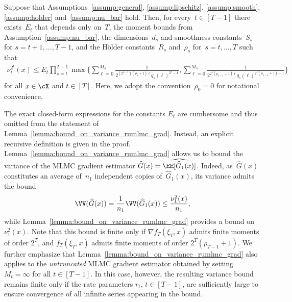 \documentclass[11pt]{article}
\let\hat\widehat
\begin{document}
\begin{lemma}
\label{lemma:bound_on_variance_rumlmc_grad} 
Suppose that Assumptions~\ref{assump:general}, \ref{assump:lipschitz}, \ref{assump:smooth}, \ref{assump:holder} and~\ref{assump:nu_bar} hold. Then, for every~$t\in[T-1]$ there exists~$E_t$ that depends only on~$T$, the moment bounds from Assumption~\ref{assump:nu_bar}, the dimensions~$d_s$ and smoothness constants~$S_s$ for $s = t+1,\ldots,T-1$, and the Hölder constants~$R_s$ and~$\rho_s$ for~$s = t,\ldots,T$ such that
    \begin{align*}
        \nu_t^{2^t}(x) \leq  E_t\prod_{s=t}^{T-1}\max\bigg\{ \sum_{\ell=0}^{M_s}\frac{1}{2^{(2^{s-1})(\rho_s+1)\ell} q_s(\ell)^{2^{s}-1}}, \sum_{\ell=0}^{M_s}\frac{1}{2^{2^s(\rho_{s-1}+1) \ell} q_s(\ell)^{2^{s}(\rho_{s-1}+1)-1}} \bigg\}
    \end{align*}
for all $x\in\cX$ and $t \in[T]$. Here, we adopt the convention~$\rho_0 = 0$ for notational convenience.
\end{lemma}

The exact closed-form expressions for the constants $E_t$ are cumbersome and thus omitted from the statement of Lemma~\ref{lemma:bound_on_variance_rumlmc_grad}. Instead, an explicit recursive definition is given in the proof. Lemma~\ref{lemma:bound_on_variance_rumlmc_grad} allows us to bound the variance of the MLMC gradient estimator $\hat G(x)=\hat\EE[\hat G_1(x)]$. Indeed, as~$\hat G(x)$ constitutes an average of~$n_1$ independent copies of~$\hat G_1(x)$, its variance admits the bound
\begin{align}\label{eq:variance-rumlmc-estimator}
    \VV(\hat{G}(x))=\frac{1}{n_1}\VV(\hat{G}_1(x))\leq  \frac{\nu_1^2(x)}{n_1}, 
\end{align}
while Lemma~\ref{lemma:bound_on_variance_rumlmc_grad} provides a bound on~$\nu_1^2(x)$. Note that this bound is finite only if $\nabla f_T(\xi_T, x)$ admits finite moments of order $2^T$, and $f_T(\xi_T, x)$ admits finite moments of order $2^T(\rho_{T-1}+1)$. We further emphasize that Lemma~\ref{lemma:bound_on_variance_rumlmc_grad} also applies to the {\em untruncated} MLMC gradient estimator obtained by setting $M_t = \infty$ for all $t \in [T-1]$. In this case, however, the resulting variance bound remains finite only if the rate parameters $r_t$, $t \in [T-1]$, are sufficiently large to ensure convergence of all infinite series appearing in the bound.
\end{document}
